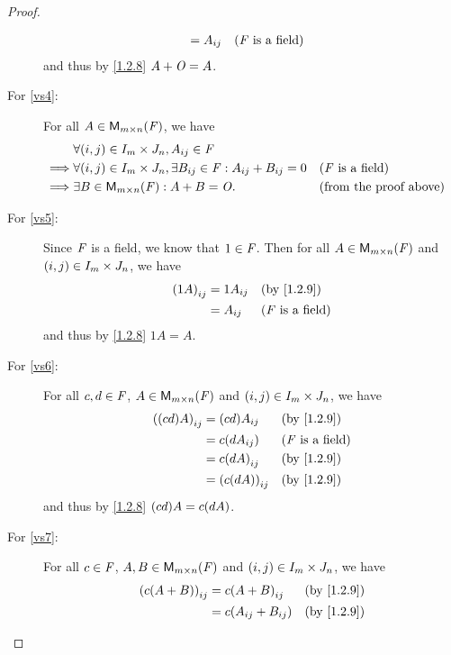 \begin{proof}
\begin{description}
\begin{align*}
				                  & = A_{i j}             &  & \text{(\(\mathit{F}\) is a field)}
			\end{align*}
			and thus by \cref{1.2.8} \(A + \mathit{O} = A\).
		\item[For \ref{vs4}:]
			For all \(A \in \mathsf{M}_{{m} \times n}({\mathit{F}})\), we have
			\begin{align*}
				         & \forall \p{i, j} \in I_{m} \times J_{n}, A_{i j} \in \F                                                                    \\
				\implies & \forall \p{i, j} \in I_{m} \times J_{n}, \exists B_{i j} \in \F : A_{i j} + B_{i j} = 0 &  & \text{(\(\F\) is a field)}    \\
				\implies & \exists B \in \MS : A + B = \zm.                                                        &  & \text{(from the proof above)}
			\end{align*}
		\item[For \ref{vs5}:]
			Since \(\mathit{F}\) is a field, we know that \(1 \in \mathit{F}\).
			Then for all \(A \in \mathsf{M}_{{m} \times n}({\mathit{F}})\) and \(\left\lparen i, j\right\rparen \in I_{m} \times J_{n}\), we have
			\begin{align*}
				\p{1A}_{i j} & = 1 A_{i j} &  & \text{(by \cref{1.2.9})}   \\
				             & = A_{i j}   &  & \text{(\(\F\) is a field)}
			\end{align*}
			and thus by \cref{1.2.8} \(1A = A\).
		\item[For \ref{vs6}:]
			For all \(c, d \in \mathit{F}\), \(A \in \mathsf{M}_{{m} \times n}({\mathit{F}})\) and \(\left\lparen i, j\right\rparen \in I_{m} \times J_{n}\), we have
			\begin{align*}
				\p{\p{cd} A}_{i j} & = \p{cd} A_{i j}      &  & \text{(by \cref{1.2.9})}   \\
				                   & = c \p{d A_{i j}}     &  & \text{(\(\F\) is a field)} \\
				                   & = c \p{d A}_{i j}     &  & \text{(by \cref{1.2.9})}   \\
				                   & = \p{c \p{d A}}_{i j} &  & \text{(by \cref{1.2.9})}
			\end{align*}
			and thus by \cref{1.2.8} \(\p{cd} A = c \p{dA}\).
		\item[For \ref{vs7}:]
			For all \(c \in \mathit{F}\), \(A, B \in \mathsf{M}_{{m} \times n}({\mathit{F}})\) and \(\left\lparen i, j\right\rparen \in I_{m} \times J_{n}\), we have
			\begin{align*}
				\p{c \p{A + B}}_{i j} & = c \p{A + B}_{i j}           &  & \text{(by \cref{1.2.9})}   \\
				                      & = c \p{A_{i j} + B_{i j}}     &  & \text{(by \cref{1.2.9})}   \\

\end{align*}
\end{description}
\end{proof}
